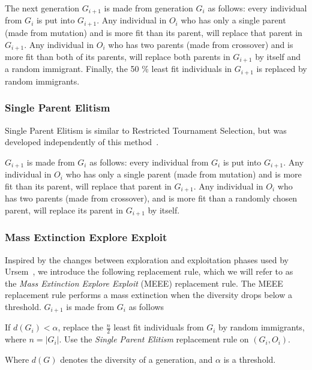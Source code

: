 The next generation $G_{i+1}$ is made from generation $G_i$ as follows: every individual from $G_i$ is put into $G_{i+1}$. Any individual in $O_i$ who has only a single parent (made from mutation) and is more fit than its parent, will replace that parent in $G_{i+1}$. Any individual in $O_i$ who has two parents (made from crossover) and is more fit than both of its parents, will replace both parents in $G_{i+1}$ by itself and a random immigrant. Finally, the 50 \% least fit individuals in $G_{i+1}$ is replaced by random immigrants.

\subsubsection{Single Parent Elitism}
Single Parent Elitism is similar to Restricted Tournament Selection, but was developed independently of this method~\cite[p.\ 132]{Luke2013Metaheuristics}.

$G_{i+1}$ is made from $G_i$ as follows: every individual from $G_i$ is put into $G_{i+1}$. Any individual in $O_i$ who has only a single parent (made from mutation) and is more fit than its parent, will replace that parent in $G_{i+1}$.
Any individual in $O_i$ who has two parents (made from crossover), and is more fit than a randomly chosen parent, will replace its parent in $G_{i+1}$ by itself.

\subsubsection{Mass Extinction Explore Exploit}
Inspired by the changes between exploration and exploitation phases used by Ursem~\cite{ursem2002diversity}, we introduce the following replacement rule, which we will refer to as the \emph{Mass Extinction Explore Exploit} (MEEE) replacement rule. The MEEE replacement rule performs a mass extinction when the diversity drops below a threshold. $G_{i+1}$ is made from $G_i$ as follows

If $d\left(G_i\right) < \alpha$, replace the $\frac{n}{2}$ least fit individuals from $G_i$ by random immigrants, where $n = \lvert G_i \rvert$. Use the \emph{Single Parent Elitism} replacement rule on $\left(G_i, O_i\right)$.

Where $d\left(G\right)$ denotes the diversity of a generation, and $\alpha$ is a threshold. 


